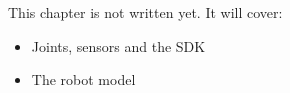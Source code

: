\label{ch:k11}
\begin{keyidea}
This chapter is not written yet. It will cover:
\begin{itemize}[nosep]
  \item Joints, sensors and the SDK
  \item The robot model
\end{itemize}
\end{keyidea}
